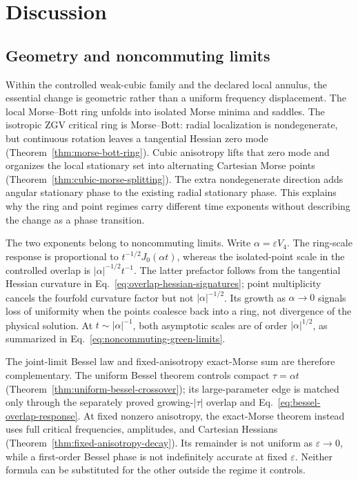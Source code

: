 \section{Discussion}

\subsection{Geometry and noncommuting limits}

Within the controlled weak-cubic family and the declared local annulus, the
essential change is geometric rather than a uniform frequency displacement.
The local Morse--Bott ring unfolds into isolated Morse minima and saddles.
The isotropic ZGV critical ring is Morse--Bott: radial localization is
nondegenerate, but continuous rotation leaves a tangential Hessian zero mode
(Theorem~\ref{thm:morse-bott-ring}).  Cubic anisotropy lifts that zero mode and
organizes the local stationary set into alternating Cartesian Morse points
(Theorem~\ref{thm:cubic-morse-splitting}).  The extra nondegenerate direction
adds angular stationary phase to the existing radial stationary phase.  This
explains why the ring and point regimes carry different time exponents without
describing the change as a phase transition.

The two exponents belong to noncommuting limits.  Write
\(\alpha=\varepsilon V_4\).  The ring-scale response is proportional to
\(t^{-1/2}J_0(\alpha t)\), whereas the isolated-point scale in the controlled
overlap is \(\lvert\alpha\rvert^{-1/2}t^{-1}\).  The latter prefactor follows
from the tangential Hessian curvature in
Eq.~\eqref{eq:overlap-hessian-signatures}; point multiplicity cancels the
fourfold curvature factor but not \(\lvert\alpha\rvert^{-1/2}\).  Its growth as
\(\alpha\to0\) signals loss of uniformity when the points coalesce back into a
ring, not divergence of the physical solution.  At
\(t\sim\lvert\alpha\rvert^{-1}\), both asymptotic scales are of order
\(\lvert\alpha\rvert^{1/2}\), as summarized in
Eq.~\eqref{eq:noncommuting-green-limits}.

The joint-limit Bessel law and fixed-anisotropy exact-Morse sum are therefore
complementary.  The
uniform Bessel theorem controls compact \(\tau=\alpha t\)
(Theorem~\ref{thm:uniform-bessel-crossover}); its large-parameter edge is
matched only through the separately proved growing-\(\lvert\tau\rvert\)
overlap and Eq.~\eqref{eq:bessel-overlap-response}.  At fixed nonzero
anisotropy, the exact-Morse theorem instead uses full critical frequencies,
amplitudes, and Cartesian Hessians (Theorem~\ref{thm:fixed-anisotropy-decay}).
Its remainder is not uniform as \(\varepsilon\to0\), while a first-order
Bessel phase is not indefinitely accurate at fixed \(\varepsilon\).  Neither
formula can be substituted for the other outside the regime it controls.

